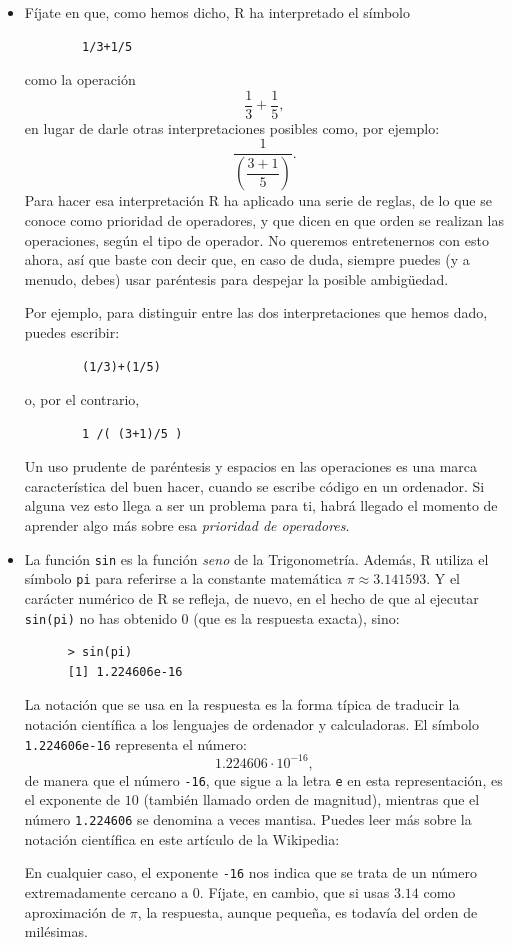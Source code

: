 \documentclass[10pt,a4paper]{article}\usepackage[]{graphicx}\usepackage[]{color}
\newcounter {cont01}
\begin{document}
\begin{itemize}
  \item Fíjate en que, como hemos dicho, R ha interpretado el símbolo
        \begin{verbatim}
        1/3+1/5
        \end{verbatim}
        como la operación
        \[\dfrac{1}{3}+\dfrac{1}{5},\]
        en lugar de darle otras interpretaciones posibles como, por ejemplo:
        \[\dfrac{1}{\left(\dfrac{3+1}{5}\right)}.\]
        Para hacer esa interpretación R ha aplicado una serie de reglas, de lo que se conoce como {\sf prioridad de operadores}, y que dicen en que orden se realizan las operaciones, según el tipo de operador. No queremos entretenernos con esto ahora, así que baste con decir que, en caso de duda, siempre puedes (y a menudo, debes) usar paréntesis para despejar la posible ambigüedad.
        \newpage

        Por ejemplo, para distinguir entre las dos interpretaciones que hemos dado, puedes escribir:
        \begin{verbatim}
        (1/3)+(1/5)
        \end{verbatim}
        o, por el contrario,
        \begin{verbatim}
        1 /( (3+1)/5 )
        \end{verbatim}
        Un uso prudente de paréntesis y espacios en las operaciones es una marca característica del buen hacer, cuando se escribe código en un ordenador. Si alguna vez esto llega a ser un problema para ti, habrá llegado el momento de aprender algo más sobre esa {\em prioridad de operadores}.

  \item La función {\tt sin} es la función {\em seno} de la Trigonometría. Además, R utiliza el símbolo {\tt pi} para referirse a la constante matemática $\pi\approx 3.141593$. Y el carácter numérico de R se refleja, de nuevo, en el hecho de que al ejecutar {\tt sin(pi)} no has obtenido $0$ (que es la respuesta exacta), sino:
      \begin{verbatim}
      > sin(pi)
      [1] 1.224606e-16
      \end{verbatim}
      La notación que se usa en la respuesta es la forma típica de traducir la {\sf notación científica} a los lenguajes de ordenador y calculadoras. El símbolo {\tt 1.224606e-16} representa el número:
      \[1.224606\cdot 10^{-16},\]
      de manera que el número {\tt -16}, que sigue a la letra {\tt e} en esta representación, es el {\sf exponente} de $10$ (también llamado {\sf orden de magnitud}), mientras que el número {\tt 1.224606} se denomina a veces {\sf mantisa}. Puedes leer más sobre la notación científica en este artículo de la Wikipedia:
      \begin{center}
      \end{center}
      En cualquier caso, el exponente {\tt -16} nos indica que se trata de un número extremadamente cercano a $0$. Fíjate, en cambio, que si usas $3.14$ como aproximación de $\pi$, la respuesta, aunque pequeña, es todavía del orden de milésimas.
\end{itemize}
\end{document}

